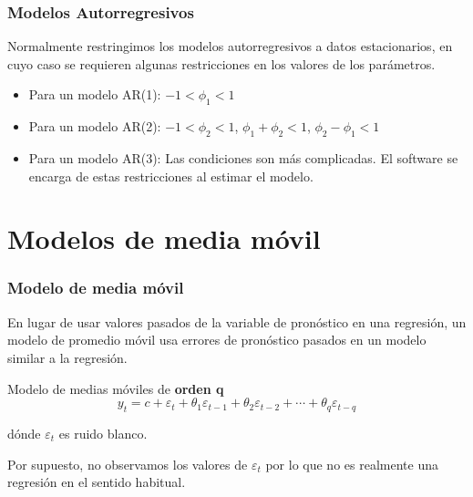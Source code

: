 \documentclass[10pt]{beamer}
\begin{document}




\begin{frame}[fragile]
\frametitle{Modelos Autorregresivos}


Normalmente restringimos los modelos autorregresivos a datos estacionarios, en cuyo caso se requieren algunas restricciones en los valores de los parámetros.

\vspace{4mm}

\begin{itemize}
\item Para un modelo AR(1): $-1 < \phi_1 < 1$
\item Para un modelo AR(2): $-1 < \phi_2 < 1$, $\phi_1 + \phi_2 < 1$, $\phi_2 - \phi_1 < 1$
\item Para un modelo AR(3): Las condiciones son más complicadas. El software se encarga de estas restricciones al estimar el modelo.
\end{itemize}

\end{frame}




\section{Modelos de media móvil}


\begin{frame}[fragile]
\frametitle{Modelo de media móvil}


En lugar de usar valores pasados de la variable de pronóstico en una regresión, un modelo de promedio móvil usa errores de pronóstico pasados en un modelo similar a la regresión.


\begin{block}{Modelo de medias móviles de \textbf{orden q}}
\begin{equation}
 y_{t}  =  c +  \varepsilon_t + \theta_{1}\varepsilon_{t - 1}  +  \theta_{2}\varepsilon_{t - 2}  +  \cdots  + \theta_{q}\varepsilon_{t - q}
\end{equation}

dónde $\varepsilon_t$ es ruido blanco.
\end{block}

Por supuesto, no observamos los valores de $\varepsilon_t$ por lo que no es realmente una regresión en el sentido habitual.


\begin{center}
\end{center}

\end{frame}
\end{document}
